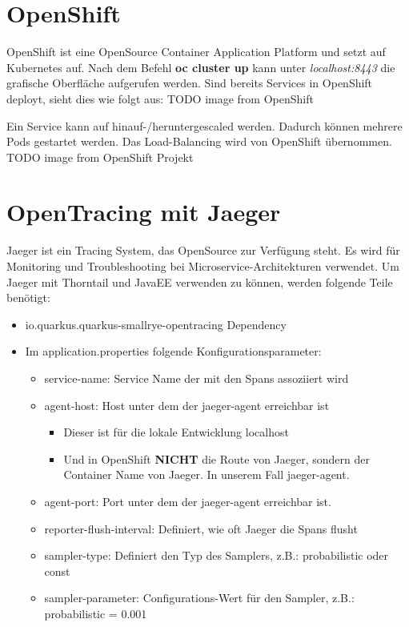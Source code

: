 \documentclass[11pt, a4paper, twoside]{article}   	%
\begin{document}
\section{OpenShift}
OpenShift ist eine OpenSource Container Application Platform und setzt auf Kubernetes auf.
Nach dem Befehl \textbf{oc cluster up} kann unter \textit{localhost:8443} die grafische Oberfläche aufgerufen werden.
Sind bereits Services in OpenShift deployt, sieht dies wie folgt aus:
TODO image from OpenShift

Ein Service kann auf hinauf-/heruntergescaled werden. Dadurch können mehrere Pods gestartet werden. Das Load-Balancing wird von OpenShift übernommen.
TODO image from OpenShift Projekt

\section{OpenTracing mit Jaeger}
Jaeger ist ein Tracing System, das OpenSource zur Verfügung steht. Es wird für Monitoring und Troubleshooting bei Microservice-Architekturen verwendet.
Um Jaeger mit Thorntail und JavaEE verwenden zu können, werden folgende Teile benötigt:
\begin{itemize}
	\item io.quarkus.quarkus-smallrye-opentracing  Dependency
	\item Im application.properties folgende Konfigurationsparameter:
	\begin{itemize}
		\item service-name: Service Name der mit den Spans assoziiert wird
		\item agent-host: Host unter dem der jaeger-agent erreichbar ist
		\begin{itemize}
			\item Dieser ist für die lokale Entwicklung localhost
			\item Und in OpenShift \textbf{NICHT} die Route von Jaeger, sondern der Container Name von Jaeger. In unserem Fall jaeger-agent.
		\end{itemize}
		\item agent-port: Port unter dem der jaeger-agent erreichbar ist.
		\item reporter-flush-interval: Definiert, wie oft Jaeger die Spans flusht
		\item sampler-type: Definiert den Typ des Samplers, z.B.: probabilistic oder const
		\item sampler-parameter: Configurations-Wert für den Sampler, z.B.: probabilistic = 0.001
	\end{itemize}
\end{itemize} 
\end{document}
